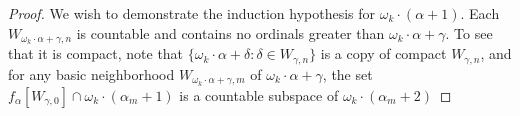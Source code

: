 \documentclass[11pt]{article}
\begin{document}
\begin{proof}
    We wish to demonstrate the induction hypothesis for
    \(\omega_k\cdot(\alpha+1)\). Each
    \(W_{\omega_k\cdot\alpha+\gamma,n}\) is countable and contains no
    ordinals greater than \(\omega_k\cdot\alpha+\gamma\). To see that it is
    compact, note that \(\{\omega_k\cdot\alpha+\delta:\delta\in W_{\gamma,n}\}\)
    is a copy of compact \(W_{\gamma,n}\), and for any basic neighborhood
    \(W_{\omega_k\cdot\alpha+\gamma,m}\)
    of \(\omega_k\cdot\alpha+\gamma\), the set
    \(
      f_\alpha[W_{\gamma,0}]
        \cap
      \omega_k\cdot(\alpha_m+1)
    \)
    is a countable subspace of \(\omega_k\cdot(\alpha_m+2)\)







\end{proof}
\end{document}
